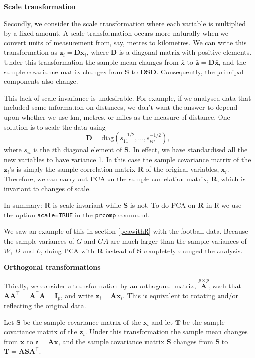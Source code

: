 \documentclass[]{book}
\theoremstyle{definition}
\theoremstyle{definition}
\theoremstyle{definition}
\theoremstyle{remark}
\begin{document}
\textbf{Scale transformation}

Secondly, we consider the scale transformation where each variable is multiplied by a fixed amount.
A scale transformation occurs more naturally when we convert units of measurement from, say, metres to kilometres. We can write this transformation as \(\mathbf z_i = \mathbf D\mathbf x_i\), where \(\mathbf D\) is a diagonal matrix with positive elements. Under this transformation the sample mean changes from \(\bar{\mathbf x}\) to \(\bar{\mathbf z} = \mathbf D\bar{\mathbf x}\), and the sample covariance matrix changes from \(\mathbf S\) to \(\mathbf D\mathbf S\mathbf D\). Consequently, the principal components also change.

This lack of scale-invariance is undesirable. For example, if we analysed data that included some information on distances, we don't want the answer to depend upon whether we use km, metres, or miles as the measure of distance.
One solution is to scale the data using
\[
\mathbf D= \text{diag}(s_{11}^{-1/2}, \ldots , s_{pp}^{-1/2}),
 \]
where \(s_{ii}\) is the \(i\)th diagonal element of \(\mathbf S\). In effect, we have standardised all the new variables to have variance 1. In this case the sample covariance matrix of the \(\mathbf z_i\)'s is simply the sample correlation matrix \(\mathbf R\) of the original variables, \(\mathbf x_i\). Therefore, we can carry out PCA on the sample correlation matrix, \(\mathbf R\), which is invariant to changes of scale.

In summary: \(\mathbf R\) is scale-invariant while \(\mathbf S\) is not. To do PCA on \(\mathbf R\) in R we use the option \texttt{scale=TRUE} in the \texttt{prcomp} command.

We saw an example of this in section \ref{pcawithR} with the football data. Because the sample
variances of \(G\) and \(GA\) are much larger than the sample variances of \(W\), \(D\) and \(L\), doing PCA with \(\mathbf R\) instead of \(\mathbf S\) completely changed the analysis.

\textbf{Orthogonal transformations}

Thirdly, we consider a transformation by an orthogonal matrix, \(\stackrel{p \times p}{\mathbf A}\), such that \(\mathbf A\mathbf A^\top = \mathbf A^\top \mathbf A= \mathbf I_p\), and write \(\mathbf z_i = \mathbf A\mathbf x_i\). This is equivalent to rotating and/or reflecting the original data.

Let \(\mathbf S\) be the sample covariance matrix of the \(\mathbf x_i\) and let \(\mathbf T\) be the sample covariance matrix of the \(\mathbf z_i\). Under this transformation the sample mean changes from \(\bar{\mathbf x}\) to \(\bar{\mathbf z} = \mathbf A\bar{\mathbf x}\), and the sample covariance matrix \(\mathbf S\) changes from \(\mathbf S\) to \(\mathbf T= \mathbf A\mathbf S\mathbf A^\top\).
\end{document}
